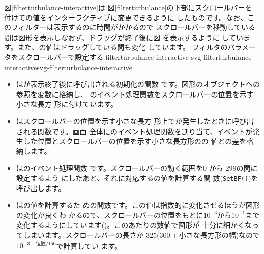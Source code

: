 図\ref{filterturbulance-interactive}は
図\ref{filterturbulance}の下部にスクロールバーを
付けての値をインターラクティブに変更できるように
したものです。なお、このフィルターは表示するのに時間がかかるので
スクロールバーを移動している間は図形を表示しなおず、ドラッグが終了後に図
を表示するように
しています。また、の値はドラッグしている間も変化
しています。
{フィルタのパラメータをスクロールバーで設定する}
{filterturbulance-interactive}
{svg-filterturbulance-interactive}{svg-filterturbulance-interactive}
\begin{itemize}
 \item {}は\SVG が表示終了後に呼び出される初期化の関数
       です。図形のオブジェクトへの参照を変数に格納し、
       のイベント処理関数をスクロールバーの位置を示す小さな長方
       形に付けています。
 \item {}はスクロールバーの位置を示す小さな長方
       形上でが発生したときに呼び出される関数です。画面
       全体にのイベント処理関数を割り当て、イベントが発
       生した位置とスクロールバーの位置を示す小さな長方形のの
       値との差を格納します。
 \item {}はのイベント処理関数
       です。スクロールバーの動く範囲を$0$ から $299$の間に設定するよう
       にしたあと、それに対応するの値を計算する関
       数(\texttt{SetBF()})を呼び出します。
 \item {}はの値を計算するた
       めの関数です。この値は指数的に変化させるほうが図形の変化が良くわ
       かるので、スクロールバーの位置をもとに$10^{-3}$から$10^{-1}$まで
       変化するようにしています()。このあたりの数値で図形が
       十分に細かくなってしまいます。スクロールバーの長さが
       $325$($300+小さな長方形の幅$)なので$10^{-3+位置/150}$で計算してい
       ます。


\end{itemize}
